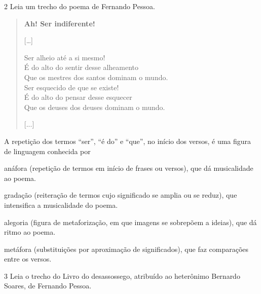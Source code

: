 
\num{2} Leia um trecho do poema de Fernando Pessoa.


\begin{verse}
\textbf{Ah! Ser indiferente!}

{[}\ldots{}{]}

Ser alheio até a si mesmo!\\
É do alto do sentir desse alheamento\\
Que os mestres dos santos dominam o mundo.\\
Ser esquecido de que se existe!\\
É do alto do pensar desse esquecer\\
Que os deuses dos deuses dominam o mundo.

{[}...{]}
\end{verse}


A repetição dos termos ``ser'', ``é do'' e ``que'', no início dos
versos, é uma figura de linguagem conhecida por

\begin{escolha}
\item anáfora (repetição de termos em início de frases ou versos), que dá
musicalidade ao poema.

\item gradação (reiteração de termos cujo significado se amplia ou se
reduz), que intensifica a musicalidade do poema.

\item alegoria (figura de metaforização, em que imagens se sobrepõem a
ideias), que dá ritmo ao poema.

\item metáfora (substituições por aproximação de significados), que faz
comparações entre os versos.
\end{escolha}


\num{3} Leia o trecho do Livro do desassossego, atribuído ao heterônimo Bernardo Soares, de Fernando Pessoa.

